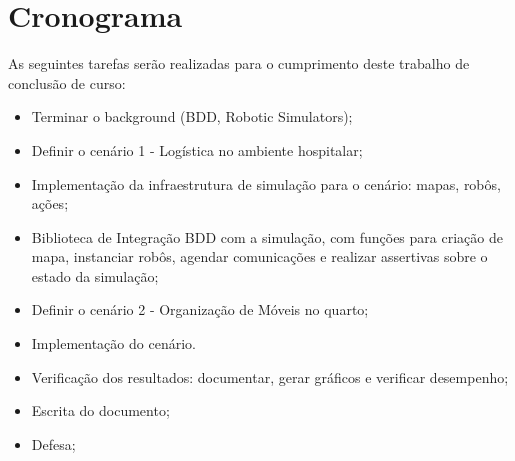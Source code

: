 \section{Cronograma}
As seguintes tarefas serão realizadas para o cumprimento deste trabalho de conclusão de curso:
\begin{itemize}
    \item Terminar o background (BDD, Robotic Simulators);
    \item Definir o cenário 1 - Logística no ambiente hospitalar;
    \item Implementação da infraestrutura de simulação para o cenário: mapas, robôs, ações; 
    \item Biblioteca de Integração BDD com a simulação, com funções para criação de mapa, instanciar robôs, agendar comunicações e realizar assertivas sobre o estado da simulação;
    \item Definir o cenário 2 - Organização de Móveis no quarto;
    \item Implementação do cenário.
    \item Verificação dos resultados: documentar, gerar gráficos e verificar desempenho;
    \item Escrita do documento;
    \item Defesa;


\end{itemize}